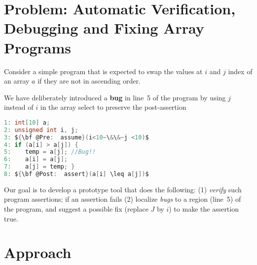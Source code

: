 \documentclass[a4paper, 12pt, notitlepage] {article}
\newcommand{\hide}[1]{}
\newcommand{\mscmt}[1]{{\color{blue} \tiny{Srivas: {#1}}}}
\begin{document}
\section {Problem: Automatic Verification, Debugging and Fixing Array Programs}
\hide{For the demonstration of problem, we shall give an example.}
Consider a simple program that is expected to swap the values at $i$ and $j$ index of an array $a$ if they are not in ascending order.
\hide{We are writing the program in C-like syntax for demonstration only, in practice, the program will be written in the grammar defined by our language with the pre/post conditions.}
We have deliberately introduced a {\bf bug} in line~5 of the program by using $j$ instead of $i$ in the array select to preserve the post-assertion\\ 

\begin{lstlisting}[language=C, mathescape=true]
1: int[10] a;
2: unsigned int i, j;
3: ${\bf @Pre:  assume}(i<10~\&\&~j <10)$
4: if (a[i] > a[j]) {
5:    temp = a[j]; //Bug!!
6:    a[i] = a[j];
7:    a[j] = temp; }
8: ${\bf @Post:  assert}(a[i] \leq a[j])$
\end{lstlisting}
$ $\\
Our goal is to develop a prototype tool that does the following:
(1) \emph{verify} such program assertions; if an assertion fails (2) localize \emph{bugs} to a region (line~5) of the program, and suggest a possible fix (replace $J$ by $i$) to make the assertion true.
\section {Approach}
\hide{
\mscmt{Merge this part with Approach; Note that for SMT proposal you have a limit of 2 pages.} \\
\mscmt{You can include an extended version of the grammar I have shown for Problem 3 of assignment to include array selects and updates.} \\
\mscmt{You should specify the class of fixes you will be restricting yourself to.} \\
}
\end{document}
